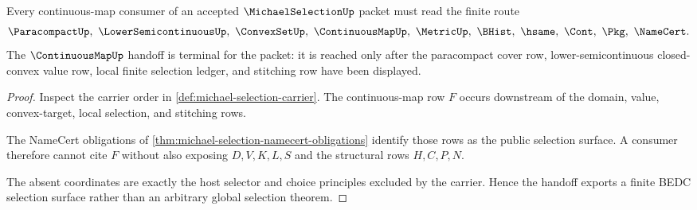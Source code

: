 \begin{theorem}
\label{thm:michael-selection-continuous-handoff-boundary}
Every continuous-map consumer of an accepted $\MichaelSelectionUp$ packet must read the finite route
$$
\ParacompactUp,\ \LowerSemicontinuousUp,\ \ConvexSetUp,\ \ContinuousMapUp,\ \MetricUp,\ \BHist,\ \hsame,\ \Cont,\ \Pkg,\ \NameCert .
$$
The $\ContinuousMapUp$ handoff is terminal for the packet: it is reached only after the paracompact cover row, lower-semicontinuous closed-convex value row, local finite selection ledger, and stitching row have been displayed.
\end{theorem}
\begin{proof}
Inspect the carrier order in \autoref{def:michael-selection-carrier}. The continuous-map row $F$ occurs downstream of the domain, value, convex-target, local selection, and stitching rows.

The NameCert obligations of \autoref{thm:michael-selection-namecert-obligations} identify those rows as the public selection surface. A consumer therefore cannot cite $F$ without also exposing $D,V,K,L,S$ and the structural rows $H,C,P,N$.

The absent coordinates are exactly the host selector and choice principles excluded by the carrier. Hence the handoff exports a finite BEDC selection surface rather than an arbitrary global selection theorem.
\end{proof}




